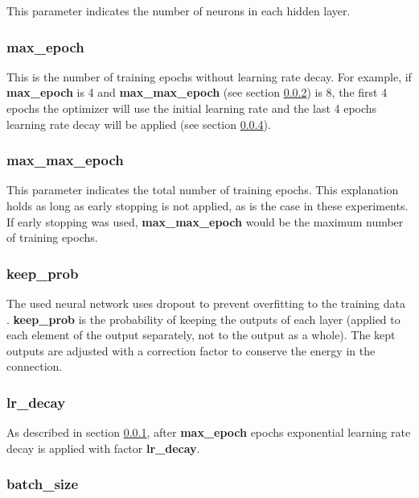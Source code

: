 \documentclass[10pt,a4paper,titlepage]{article}
\begin{document}
This parameter indicates the number of neurons in each hidden layer.

\subsubsection{max\_epoch}
\label{subsubsec:max}

This is the number of training epochs without learning rate decay. For example, if \textbf{max\_epoch} is 4 and \textbf{max\_max\_epoch} (see section \ref{subsubsec:maxmax}) is 8, the first 4 epochs the optimizer will use the initial learning rate and the last 4 epochs learning rate decay will be applied (see section \ref{subsubsec:decay}).

\subsubsection{max\_max\_epoch}
\label{subsubsec:maxmax}

This parameter indicates the total number of training epochs. This explanation holds as long as early stopping is not applied, as is the case in these experiments. If early stopping was used, \textbf{max\_max\_epoch} would be the maximum number of training epochs.

\subsubsection{keep\_prob}

The used neural network uses dropout to prevent overfitting to the training data \cite{dropout}. \textbf{keep\_prob} is the probability of keeping the outputs of each layer (applied to each element of the output separately, not to the output as a whole). The kept outputs are adjusted with a correction factor to conserve the energy in the connection.

\subsubsection{lr\_decay}
\label{subsubsec:decay}

As described in section \ref{subsubsec:max}, after \textbf{max\_epoch} epochs exponential learning rate decay is applied with factor \textbf{lr\_decay}.

\subsubsection{batch\_size}
\end{document}
